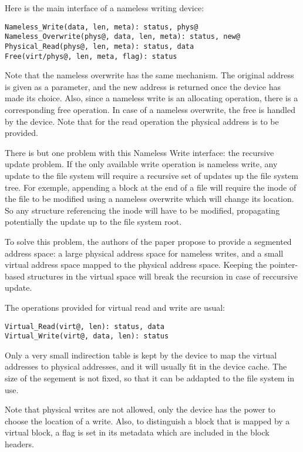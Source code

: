 \documentclass[twocolumn,a4paper,10pt]{article}
\begin{document}
Here is the main interface of a nameless writing device:
\begin{lstlisting}
Nameless_Write(data, len, meta): status, phys@
Nameless_Overwrite(phys@, data, len, meta): status, new@
Physical_Read(phys@, len, meta): status, data
Free(virt/phys@, len, meta, flag): status
\end{lstlisting}
Note that the nameless overwrite has the same mechanism. The original address
is given as a parameter, and the new address is returned once the device has
made its choice. Also, since a nameless write is an allocating operation,
there is a corresponding free operation. In case of a nameless overwrite, the
free is handled by the device. Note that for the read operation the physical
address is to be provided.

There is but one problem with this Nameless Write interface: the recursive
update problem. If the only available write operation is nameless write, any
update to the file system will require a recursive set of updates up the file
system tree. For exemple, appending a block at the end of a file will require
the inode of the file to be modified using a nameless overwrite which will
change its location. So any structure referencing the inode will have to be
modified, propagating potentially the update up to the file system root.

To solve this problem, the authors of the paper propose to provide a segmented
address space: a large physical address space for nameless writes, and a small
virtual address space mapped to the physical address space. Keeping the
pointer-based structures in the virtual space will break the recursion in case
of reccursive update.

The operations provided for virtual read and write are usual:
\begin{lstlisting}
Virtual_Read(virt@, len): status, data
Virtual_Write(virt@, data, len): status
\end{lstlisting}

Only a very small indirection table is kept by the device to map the virtual
addresses to physical addresses, and it will usually fit in the device cache.
The size of the segement is not fixed, so that it can be addapted to the file
system in use.

Note that physical writes are not allowed, only the device has the power to
choose the location of a write. Also, to distinguish a block that is mapped by
a virtual block, a flag is set in its metadata which are included in the block
headers.
\end{document}

